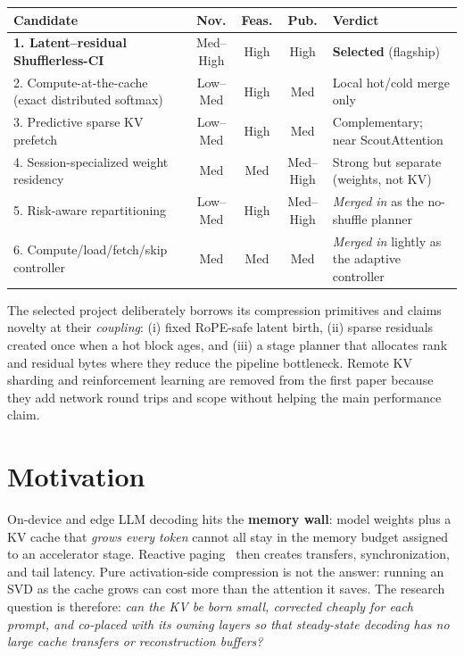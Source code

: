 \documentclass[11pt]{article}
\newcommand{\term}[1]{\textbf{\color{accent!85!black}#1}}
\begin{document}
\begin{center}
\renewcommand{\arraystretch}{1.28}
\small
\begin{tabular}{@{}p{4.5cm}ccc p{4.0cm}@{}}
\toprule
\textbf{Candidate} & \textbf{Nov.} & \textbf{Feas.} & \textbf{Pub.} & \textbf{Verdict} \\
\midrule
\textbf{1. Latent--residual Shufflerless-CI} & Med--High & High & High & \textbf{Selected} (flagship) \\
2. Compute-at-the-cache (exact distributed softmax) & Low--Med & High & Med & Local hot/cold merge only \\
3. Predictive sparse KV prefetch & Low--Med & High & Med & Complementary; near ScoutAttention \\
4. Session-specialized weight residency & Med & Med & Med--High & Strong but separate (weights, not KV) \\
5. Risk-aware repartitioning & Low--Med & High & Med--High & \emph{Merged in} as the no-shuffle planner \\
6. Compute/load/fetch/skip controller & Med & Med & Med & \emph{Merged in} lightly as the adaptive controller \\
\bottomrule
\end{tabular}
\end{center}

\noindent The selected project deliberately borrows its compression primitives and claims
novelty at their \emph{coupling}: (i) fixed RoPE-safe latent birth, (ii) sparse residuals
created once when a hot block ages, and (iii) a stage planner that allocates rank and residual
bytes where they reduce the pipeline bottleneck. Remote KV sharding and reinforcement learning
are removed from the first paper because they add network round trips and scope without helping
the main performance claim.

\section{Motivation}

\begin{motivebox}
On-device and edge LLM decoding hits the \term{memory wall}: model weights plus a KV cache
that \emph{grows every token} cannot all stay in the memory budget assigned to an accelerator
stage. Reactive paging~\cite{pagedattention} then creates transfers, synchronization, and tail
latency. Pure activation-side compression is not the answer: running an SVD as the cache grows
can cost more than the attention it saves. The research question is therefore: \emph{can the
KV be born small, corrected cheaply for each prompt, and co-placed with its owning layers so
that steady-state decoding has no large cache transfers or reconstruction buffers?}
\end{motivebox}
\end{document}
